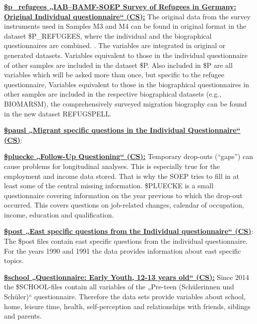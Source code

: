 \documentclass[letterpaper,10pt,openany,onesideH,english]{sphinxmanual}
\begin{document}
 \href{https://paneldata.org/soep-core/data/bgp_refugees}{\textbf{\$p\_refugees „IAB--BAMF-SOEP Survey of Refugees in Germany: Original Individual questionnaire“ (CS):}} The original data from the survey instruments used in Samples M3 and M4 can be found in original format in the dataset \$P\_REFUGEES, where the individual and the biographical questionnaires are combined. . The variables are integrated in original or generated datasets. Variables equivalent to those in the individual questionnaire of other samples are included in the dataset \$P. Also included in \$P are all variables which will be asked more than once, but specific to the refugee questionnaire, Variables equivalent to those in the biographical questionnaires in other samples are included in the respective biographical datasets (e.g., BIOMARSM), the comprehensively surveyed migration biography can be found in the new dataset REFUGSPELL.

 \href{https://paneldata.org/soep-core/data/lpausl}{\textbf{\$pausl „Migrant specific questions in the Individual Questionnaire“ (CS)}}:

 \href{https://paneldata.org/soep-core/data/bfpluecke}{\textbf{\$pluecke „Follow-Up Questioning“ (CS):}} Temporary drop-outs (“gaps”) can cause problems for longitudinal analyses. This is especially true for the employment and income data stored. That is why the SOEP tries to fill in at least some of the central missing information. \$PLUECKE is a small questionnaire covering information on the year previous to which the drop-out occurred. This covers questions on job-related changes, calendar of occupation, income, education and qualification.

 \href{https://paneldata.org/soep-core/data/hpost}{\textbf{\$post „East specific questions from the Individual questionnaire“ (CS)}}: The \$post files contain east specific questions from the individual questionnaire. For the years 1990 and 1991 the data provides information about east specific topics.

 \href{https://paneldata.org/soep-core/data/bgschool}{\textbf{\$school „Questionnaire: Early Youth, 12-13 years old“ (CS):}} Since 2014 the \$SCHOOL-files contain all variables of the „Pre-teen (Schülerinnen und Schüler)“ questionnaire. Therefore the data sets provide variables about school, home, leisure time, health, self-perception and relationships with friends, siblings and parents.
\end{document}
